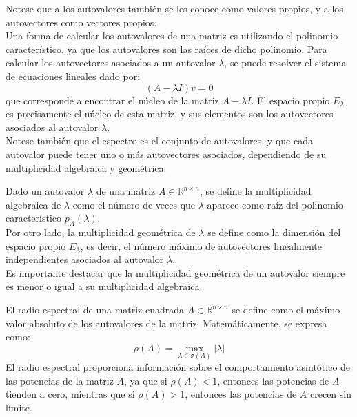 Notese que a los autovalores también se les conoce como valores propios, y a los autovectores como vectores propios.\\

Una forma de calcular los autovalores de una matriz es utilizando el polinomio característico, ya que los autovalores son las raíces de dicho polinomio. Para calcular los autovectores asociados a un autovalor $ \lambda $, se puede resolver el sistema de ecuaciones lineales dado por:
\[
    (A - \lambda I)v = 0
\]
que corresponde a encontrar el núcleo de la matriz $ A - \lambda I $. El espacio propio $ E_\lambda $ es precisamente el núcleo de esta matriz, y sus elementos son los autovectores asociados al autovalor $ \lambda $.\\

Notese también que el espectro es el conjunto de autovalores, y que cada autovalor puede tener uno o más autovectores asociados, dependiendo de su multiplicidad algebraica y geométrica.

\begin{definición}
    Dado un autovalor $ \lambda $ de una matriz $ A \in \mathbb{R}^{n \times n} $, se define la multiplicidad algebraica de $ \lambda $ como el número de veces que $ \lambda $ aparece como raíz del polinomio característico $ p_A(\lambda) $.\\
    Por otro lado, la multiplicidad geométrica de $ \lambda $ se define como la dimensión del espacio propio $ E_\lambda $, es decir, el número máximo de autovectores linealmente independientes asociados al autovalor $ \lambda $.\\
    Es importante destacar que la multiplicidad geométrica de un autovalor siempre es menor o igual a su multiplicidad algebraica.
\end{definición}

\begin{definición}
    El radio espectral de una matriz cuadrada $ A \in \mathbb{R}^{n \times n} $ se define como el máximo valor absoluto de los autovalores de la matriz. Matemáticamente, se expresa como:
    \[
        \rho(A) = \max_{\lambda \in \sigma(A)} |\lambda|
    \]
    El radio espectral proporciona información sobre el comportamiento asintótico de las potencias de la matriz $ A $, ya que si $ \rho(A) < 1 $, entonces las potencias de $ A $ tienden a cero, mientras que si $ \rho(A) > 1 $, entonces las potencias de $ A $ crecen sin límite.
\end{definición}

